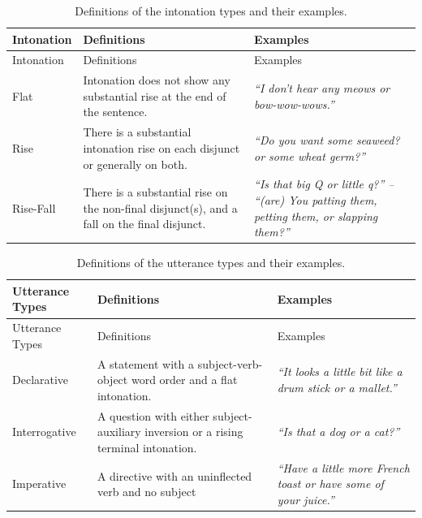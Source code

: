 \documentclass[
  english,
  ,man,floatsintext]{apa6}
\begin{document}
\begin{longtable}[]{@{}
  >{\raggedright\arraybackslash}p{}
  >{\raggedright\arraybackslash}p{}
  >{\raggedright\arraybackslash}p{}@{}}
\caption{\label{tab:intonationTypes} Definitions of the intonation types and their examples.}\tabularnewline
\toprule
Intonation & Definitions & Examples \\
\midrule
\endfirsthead
\toprule
Intonation & Definitions & Examples \\
\midrule
\endhead
Flat & Intonation does not show any substantial rise at the end of the sentence. & \emph{``I don't hear any meows or bow-wow-wows.''} \\
Rise & There is a substantial intonation rise on each disjunct or generally on both. & \emph{``Do you want some seaweed? or some wheat germ?''} \\
Rise-Fall & There is a substantial rise on the non-final disjunct(s), and a fall on the final disjunct. & \emph{``Is that big Q or little q?'' -- ``(are) You patting them, petting them, or slapping them?''} \\
\bottomrule
\end{longtable}

\begin{longtable}[]{@{}
  >{\raggedright\arraybackslash}p{}
  >{\raggedright\arraybackslash}p{}
  >{\raggedright\arraybackslash}p{}@{}}
\caption{\label{tab:utteranceTypes} Definitions of the utterance types and their examples.}\tabularnewline
\toprule
Utterance Types & Definitions & Examples \\
\midrule
\endfirsthead
\toprule
Utterance Types & Definitions & Examples \\
\midrule
\endhead
Declarative & A statement with a subject-verb-object word order and a flat intonation. & \emph{``It looks a little bit like a drum stick or a mallet.''} \\
Interrogative & A question with either subject-auxiliary inversion or a rising terminal intonation. & \emph{``Is that a dog or a cat?''} \\
Imperative & A directive with an uninflected verb and no subject & \emph{``Have a little more French toast or have some of your juice.''} \\
\bottomrule
\end{longtable}
\end{document}
